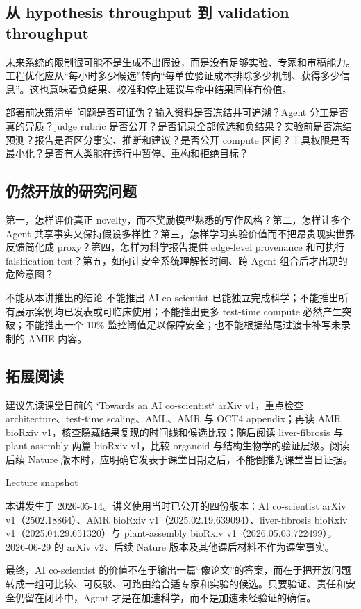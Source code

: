 \documentclass[a4paper]{article}
\begin{document}
\subsection{从 hypothesis throughput 到 validation throughput}

未来系统的限制很可能不是生成不出假设，而是没有足够实验、专家和审稿能力。工程优化应从“每小时多少候选”转向“每单位验证成本排除多少机制、获得多少信息”。这也意味着负结果、校准和停止建议与命中结果同样有价值。

\begin{knowledgebox}{部署前决策清单}
问题是否可证伪？输入资料是否冻结并可追溯？Agent 分工是否真的异质？judge rubric 是否公开？是否记录全部候选和负结果？实验前是否冻结预测？报告是否区分事实、推断和建议？是否公开 compute 区间？工具权限是否最小化？是否有人类能在运行中暂停、重构和拒绝目标？
\end{knowledgebox}

\subsection{仍然开放的研究问题}

第一，怎样评价真正 novelty，而不奖励模型熟悉的写作风格？第二，怎样让多个 Agent 共享事实又保持假设多样性？第三，怎样学习实验价值而不把昂贵现实世界反馈简化成 proxy？第四，怎样为科学报告提供 edge-level provenance 和可执行 falsification test？第五，如何让安全系统理解长时间、跨 Agent 组合后才出现的危险意图？

\begin{warningbox}{不能从本讲推出的结论}
不能推出 AI co-scientist 已能独立完成科学；不能推出所有展示案例均已发表或可临床使用；不能推出更多 test-time compute 必然产生突破；不能推出一个 10\% 监控阈值足以保障安全；也不能根据结尾过渡卡补写未录制的 AMIE 内容。
\end{warningbox}

\subsection{拓展阅读}

建议先读课堂日前的 `Towards an AI co-scientist` arXiv v1，重点检查 architecture、test-time scaling、AML、AMR 与 OCT4 appendix；再读 AMR bioRxiv v1，核查隐藏结果复现的时间线和候选比较；随后阅读 liver-fibrosis 与 plant-assembly 两篇 bioRxiv v1，比较 organoid 与结构生物学的验证层级。阅读后续 Nature 版本时，应明确它发表于课堂日期之后，不能倒推为课堂当日证据。

\begin{knowledgebox}{Lecture snapshot}
\raggedright
本讲发生于 2026-05-14。讲义使用当时已公开的四份版本：AI co-scientist arXiv v1（2502.18864）、AMR bioRxiv v1（2025.02.19.639094）、liver-fibrosis bioRxiv v1（2025.04.29.651320）与 plant-assembly bioRxiv v1（2026.05.03.722499）。2026-06-29 的 arXiv v2、后续 Nature 版本及其他课后材料不作为课堂事实。
\end{knowledgebox}

\enlargethispage{3\baselineskip}
最终，AI co-scientist 的价值不在于输出一篇“像论文”的答案，而在于把开放问题转成一组可比较、可反驳、可路由给合适专家和实验的候选。只要验证、责任和安全仍留在闭环中，Agent 才是在加速科学，而不是加速未经验证的确信。
\end{document}
